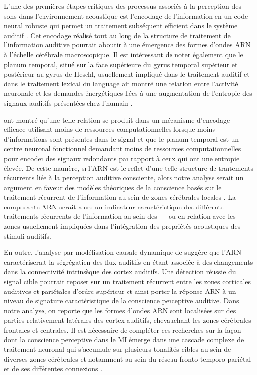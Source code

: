 L'une des premières étapes critiques des processus associés à la perception des sons dans l'environnement acoustique est l'encodage de l'information en un code neural robuste qui permet un traitement subséquent efficient dans le système auditif \citep{lewicki2002efficient}. 
Cet encodage réalisé tout au long de la structure de traitement de l'information auditive pourrait aboutir à une émergence des formes d'ondes ARN à l'échelle cérébrale macroscopique. 
Il est intéressant de noter également que le planum temporal, situé sur la face supérieure du gyrus temporal supérieur et postérieur au gyrus de Heschl, usuellement impliqué dans le traitement auditif \citep{nakada2001planum} et dans le traitement lexical du language \citep{bookheimer2002functional} ait montré une relation entre l'activité neuronale et les demandes énergétiques liées à une augmentation de l'entropie des signaux auditifs présentées chez l'humain \citep{overath2007information}. 

\cite{overath2007information} ont montré qu'une telle relation se produit dans un mécanisme d'encodage efficace utilisant moins de ressources computationnelles lorsque moins d'informations sont présentes dans le signal et que le planum temporal est un centre neuronal fonctionnel demandant moins de ressources computationnelles pour encoder des signaux redondants par rapport à ceux qui ont une entropie élevée.
De cette manière, si l'ARN est le reflet d'une telle structure de traitements récurrents liée à la perception auditive consciente, alors notre analyse serait un argument en faveur des modèles théoriques de la conscience basés sur le traitement récurrent de l'information au sein de zones cérébrales locales \citep{lamme2000distinct, lamme2003visual, lamme2006towards}. 
La composante ARN serait alors un indicateur caractéristique des différents traitements récurrents de l'information au sein des --- ou en relation avec les --- zones usuellement impliquées dans l'intégration des propriétés acoustiques des stimuli auditifs. 

En outre, l'analyse par modélisation causale dynamique de \cite{giani2015detecting} suggère que l'ARN caractériserait la ségrégation des flux auditifs en étant associée à des changements dans la connectivité intrinsèque des cortex auditifs.
Une détection réussie du signal cible pourrait reposer sur un traitement récurrent entre les zones corticales auditives et pariétales d'ordre supérieur et ainsi porter la réponse ARN à un niveau de signature caractéristique de la conscience perceptive auditive. 
Dans notre analyse, on reporte que les formes d'ondes ARN sont localisées sur des parties relativement latérales des cortex auditifs, chevauchant les zones cérébrales frontales et centrales. 
Il est nécessaire de compléter ces recherches sur la façon dont la conscience perceptive dans le MI émerge dans une cascade complexe de traitement neuronal qui s'accumule sur plusieurs tonalités cibles au sein de diverses zones cérébrales et notamment au sein du réseau fronto-temporo-pariétal et de ses différentes connexions \citep{demertzi2013consciousness, dykstra2017roadmap, eklund2019electrophysiological, eriksson2007similar, eriksson2017activity, giani2015detecting, wiegand2018cortical}. 


